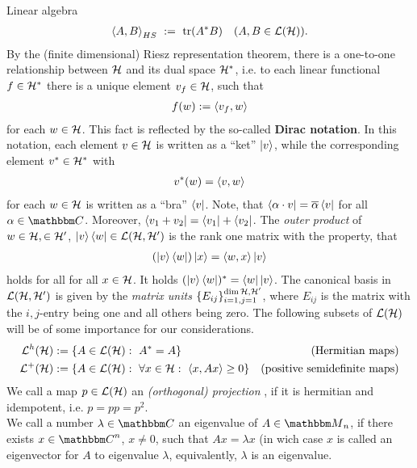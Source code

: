 \begin{section}{Linear algebra}
\begin{align}
 \braket{A,B}_{HS} \ := \ \mathrm{tr}(A^\ast B) &&(A,B \in {\mathcal L}({\mathcal H})).
\end{align}
By the (finite dimensional) Riesz representation theorem, there is a one-to-one relationship between ${\mathcal H}$ and its dual space ${\mathcal H}^\ast$, i.e. to each 
linear functional $f \in {\mathcal H}^\ast$ there is a unique element $v_f \in {\mathcal H}$, such that 
\begin{align}
 f(w) := \braket{v_f, w} 
\end{align}
for each $w \in {\mathcal H}$. This fact is reflected by the so-called \textbf{Dirac notation}. In this notation, each element $v \in {\mathcal H}$ is written as a ``ket''  $\ket{v}$, while the
corresponding element $v^\ast \in {\mathcal H}^\ast$ with 
\begin{align}
  v^\ast(w) = \braket{v,w} 
\end{align}
for each $w \in {\mathcal H}$ is written as a ``bra''  $\bra{v}$. Note, that $\bra{\alpha \cdot v} = \overline{\alpha} \bra{v}$ for all $\alpha \in \bbmC$. Moreover, $\bra{v_1 + v_2} = \bra{v_1} + \bra{v_2}$. 
The \emph{outer product}  of $w \in {\mathcal H},   \in {\mathcal H}'$, $\ket{v}\bra{w} \in {\mathcal L}({\mathcal H}, {\mathcal H}')$ is the rank one matrix with the property, 
that 
\begin{align}
  (\ket{v}\bra{w})\ket{x} = \braket{w,x} \ket{v}
\end{align}
holds for all for all $x \in {\mathcal H}$. It holds $(\ket{v}\bra{w})^\ast = \bra{w}\ket{v}$. The canonical basis in ${\mathcal L}({\mathcal H}, {\mathcal H}')$ is given by the \emph{matrix units}  $\{E_{ij}\}_{i=1,j=1}^{\dim {\mathcal H}, {\mathcal H}'}$, where $E_{ij}$ is the matrix with the $i,j$-entry being
one and all others being zero. 
The following subsets of ${\mathcal L}({\mathcal H})$ will be of some importance for our considerations. 
\begin{align*}
 \cL^h(\cH) &:= \{A \in \cL(\cH): \ A^\ast = A  \}   					&\text{(Hermitian maps)} \\ 
 \cL^+(\cH) &:= \{A \in \cL(\cH): \ \forall x \in \cH: \ \braket{x,Ax} \geq 0\}	&\text{(positive semidefinite maps)} 
\end{align*}
 We call a map $p \in {\mathcal L}({\mathcal H})$ an \emph{(orthogonal) projection} , if it is hermitian and idempotent, i.e. $p = p p = p^2$.  \\
 We call a number $\lambda \in \bbmC$ an eigenvalue  of $A \in \bbmM_n$, if there exists $x \in \bbmC^n$, $x \neq 0$, such that $Ax = \lambda x$ (in wich case $x$ is called
 an eigenvector for $A$ to eigenvalue $\lambda$, equivalently, $\lambda$ is an eigenvalue. 

\end{section}
